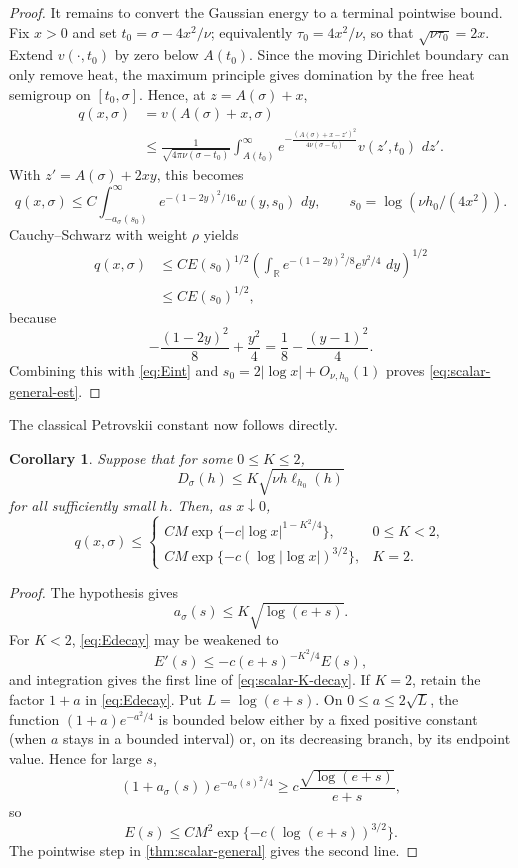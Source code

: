 \documentclass[11pt]{article}
\numberwithin{equation}{section}
\newtheorem{corollary}[corollary]{Corollary}
\theoremstyle{definition}
\newcommand{\R}{\mathbb R}
\newcommand{\dd}{\,d}
\begin{document}
\begin{proof}
It remains to convert the Gaussian energy to a terminal pointwise bound.  Fix $x>0$ and set $t_0=\sigma-4x^2/\nu$; equivalently $\tau_0=4x^2/\nu$, so that $\sqrt{\nu\tau_0}=2x$.  Extend $v(\cdot,t_0)$ by zero below $A(t_0)$.  Since the moving Dirichlet boundary can only remove heat, the maximum principle gives domination by the free heat semigroup on $[t_0,\sigma]$.  Hence, at $z=A(\sigma)+x$,
\begin{align*}
 q(x,\sigma)
 &=v(A(\sigma)+x,\sigma)\\
 &\le \frac1{\sqrt{4\pi\nu(\sigma-t_0)}}
 \int_{A(t_0)}^\infty
 e^{-\frac{(A(\sigma)+x-z')^2}{4\nu(\sigma-t_0)}}
 v(z',t_0)\,\dd z'.
\end{align*}
With $z'=A(\sigma)+2xy$, this becomes
\[
 q(x,\sigma)
 \le C\int_{-a_\sigma(s_0)}^\infty
 e^{-(1-2y)^2/16}w(y,s_0)\,\dd y,
 \qquad
 s_0=\log(\nu h_0/(4x^2)).
\]
Cauchy--Schwarz with weight $\rho$ yields
\begin{align*}
 q(x,\sigma)
 &\le CE(s_0)^{1/2}
 \left(\int_\R e^{-(1-2y)^2/8}e^{y^2/4}\,\dd y\right)^{1/2}\\
 &\le CE(s_0)^{1/2},
\end{align*}
because
\[
 -\frac{(1-2y)^2}{8}+\frac{y^2}{4}
 =\frac18-\frac{(y-1)^2}{4}.
\]
Combining this with \eqref{eq:Eint} and $s_0=2|\log x|+O_{\nu,h_0}(1)$ proves \eqref{eq:scalar-general-est}.
\end{proof}

The classical Petrovskii constant now follows directly.

\begin{corollary}\label{cor:scalar-K}
Suppose that for some $0\le K\le2$,
\begin{equation}\label{eq:scalar-K-cond}
 D_\sigma(h)
 \le K\sqrt{\nu h\ell_{h_0}(h)}
\end{equation}
for all sufficiently small $h$.  Then, as $x\downarrow0$,
\begin{equation}\label{eq:scalar-K-decay}
 q(x,\sigma)\le
 \begin{cases}
 CM\exp\{-c|\log x|^{1-K^2/4}\},&0\le K<2,\\[1mm]
 CM\exp\{-c(\log|\log x|)^{3/2}\},&K=2.
 \end{cases}
\end{equation}
\end{corollary}

\begin{proof}
The hypothesis gives
\[
 a_\sigma(s)\le K\sqrt{\log(e+s)}.
\]
For $K<2$, \eqref{eq:Edecay} may be weakened to
\[
 E'(s)\le-c(e+s)^{-K^2/4}E(s),
\]
and integration gives the first line of \eqref{eq:scalar-K-decay}.  If $K=2$, retain the factor $1+a$ in \eqref{eq:Edecay}.  Put $L=\log(e+s)$.  On $0\le a\le2\sqrt L$, the function $(1+a)e^{-a^2/4}$ is bounded below either by a fixed positive constant (when $a$ stays in a bounded interval) or, on its decreasing branch, by its endpoint value.  Hence for large $s$,
\[
 (1+a_\sigma(s))e^{-a_\sigma(s)^2/4}
 \ge c\frac{\sqrt{\log(e+s)}}{e+s},
\]
so
\[
 E(s)\le CM^2\exp\{-c(\log(e+s))^{3/2}\}.
\]
The pointwise step in \cref{thm:scalar-general} gives the second line.
\end{proof}
\end{document}
